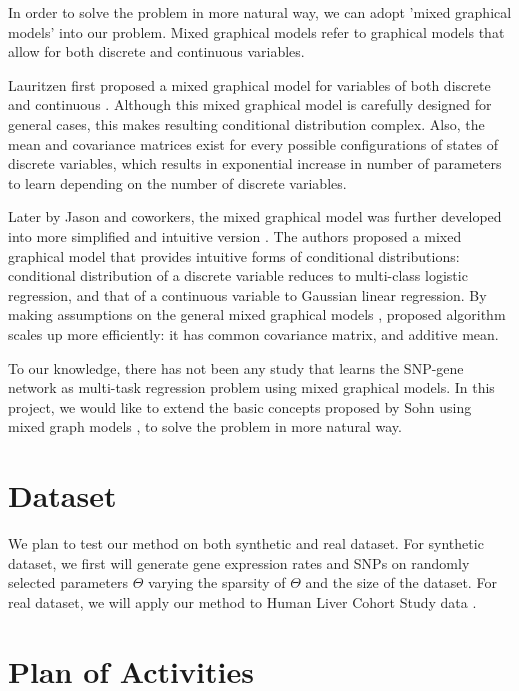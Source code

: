 \documentclass{article}
\begin{document}
In order to solve the problem in more natural way, we can adopt 'mixed graphical models' into our problem.
Mixed graphical models refer to graphical models that allow for both discrete and continuous variables.


Lauritzen first proposed a mixed graphical model for variables of both discrete and continuous \cite{lauritzen1989graphical}.
 Although this mixed graphical model is carefully designed for general cases, this makes resulting conditional distribution complex. Also, the mean and covariance matrices exist for every possible configurations of states of discrete variables, which results in exponential increase in number of parameters to learn depending on the number of discrete variables.




Later by Jason and coworkers, the mixed graphical model was further developed into more simplified and intuitive version \cite{lee2013structure}. 
The authors proposed a mixed graphical model that provides intuitive forms of conditional distributions: conditional distribution of a discrete variable reduces to multi-class logistic regression, and that of a continuous variable to Gaussian linear regression. 
By making assumptions on the general mixed graphical models  \cite{lauritzen1989graphical}, proposed algorithm scales up more efficiently: it has common covariance matrix, and additive mean.


To our knowledge, there has not been any study that learns the SNP-gene network as multi-task regression problem using mixed graphical models. 
In this project, we would like to extend the basic concepts proposed by Sohn  \cite{sohn2012joint} using mixed graph models \cite{lee2013structure}, to solve the problem in more natural way.





\section{Dataset}
We plan to test our method on both synthetic and real dataset. For synthetic dataset, we first will generate gene expression rates and SNPs on randomly selected parameters $\Theta$ varying the sparsity of $\Theta$ and the size of the dataset. For real dataset, we will apply our method to Human Liver Cohort Study data \cite{schadt2008mapping}.%

\section{Plan of Activities}
\end{document}
